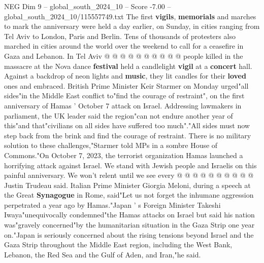 \begin{textsample}{NEG Dim 9 – global\_south\_2024\_10 – Score -7.00 – global\_south\_2024\_10/115557749.txt}
The first \textbf{vigils}, \textbf{memorials} and marches to mark the anniversary were held a day earlier, on Sunday, in cities ranging from Tel Aviv to London, Paris and Berlin.
Tens of thousands of protesters also marched in cities around the world over the weekend to call for a ceasefire in Gaza and Lebanon.
In Tel Aviv @ @ @ @ @ @ @ @ @ @ people killed in the massacre at the Nova dance \textbf{festival} held a candlelight \textbf{vigil} at a \textbf{concert} hall.
Against a backdrop of neon lights and \textbf{music}, they lit candles for their \textbf{loved} ones and embraced.
British Prime Minister Keir Starmer on Monday urged"all sides"in the Middle East conflict to"find the courage of restraint", on the first anniversary of Hamas ' October 7 attack on Israel.
Addressing lawmakers in parliament, the UK leader said the region"can not endure another year of this"and that"civilians on all sides have suffered too much"."All sides must now step back from the brink and find the courage of restraint.
There is no military solution to these challenges,"Starmer told MPs in a sombre House of Commons."On October 7, 2023, the terrorist organization Hamas launched a horrifying attack against Israel.
We stand with Jewish people and Israelis on this painful anniversary.
We won't relent until we see every @ @ @ @ @ @ @ @ @ @ Justin Trudeau said.
Italian Prime Minister Giorgia Meloni, during a speech at the Great \textbf{Synagogue} in Rome, said"Let us not forget the inhumane aggression perpetrated a year ago by Hamas."Japan ' s Foreign Minister Takeshi Iwaya"unequivocally condemned"the Hamas attacks on Israel but said his nation was"gravely concerned"by the humanitarian situation in the Gaza Strip one year on."Japan is seriously concerned about the rising tensions beyond Israel and the Gaza Strip throughout the Middle East region, including the West Bank, Lebanon, the Red Sea and the Gulf of Aden, and Iran,"he said.

\end{textsample}
